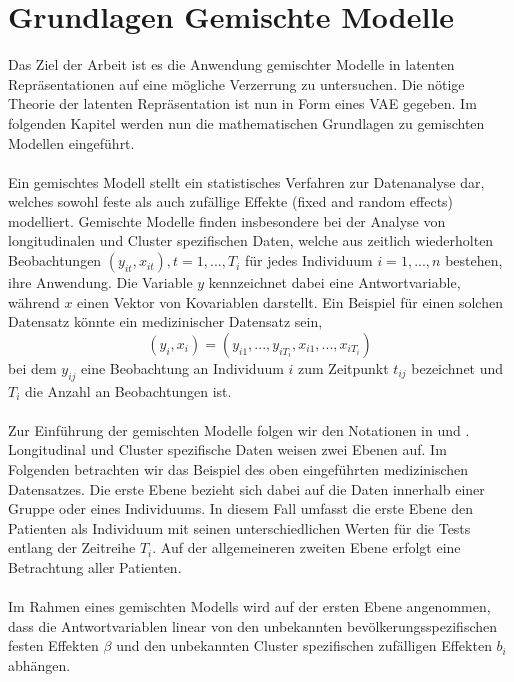 \documentclass[%
thesis=student,%
coverpage=false,%
titlepage=false,%
headmarks=true, %
german,%
font=libertine, %
math=newpxtx, %
BCOR=5mm,%
coverBCOR=11mm%
]{tumbook}
\theoremstyle{break}
\begin{document}

\section{Grundlagen Gemischte Modelle}
Das Ziel der Arbeit ist es die Anwendung gemischter Modelle in latenten Repräsentationen auf eine mögliche Verzerrung zu untersuchen. Die nötige Theorie der latenten Repräsentation ist nun in Form eines VAE gegeben. Im folgenden Kapitel werden nun die mathematischen Grundlagen zu gemischten Modellen eingeführt.\\
\\
Ein gemischtes Modell stellt ein statistisches Verfahren zur Datenanalyse dar, welches sowohl feste als auch zufällige Effekte (fixed and random effects) modelliert. Gemischte Modelle finden insbesondere bei der Analyse von longitudinalen und Cluster spezifischen Daten, welche aus zeitlich wiederholten Beobachtungen $(y_{it}, x_{it}), t = 1,..., T_i$ für jedes Individuum $ i = 1,...,n$ bestehen, ihre Anwendung. Die Variable $y$ kennzeichnet dabei eine Antwortvariable, während $x$ einen Vektor von Kovariablen darstellt. Ein Beispiel für einen solchen Datensatz könnte ein medizinischer Datensatz sein,\\
$$(y_i,x_i)= (y_{i1},...,y_{iT_i},x_{i1},...,x_{iT_i})$$
bei dem $y_{ij}$ eine Beobachtung an Individuum $i$ zum Zeitpunkt $t_{ij}$ bezeichnet und $T_i$ die Anzahl an Beobachtungen ist.\\
\\
Zur Einführung der gemischten Modelle folgen wir den Notationen in \cite{fahrmeir-2001-multivariate} und \cite{fahrmeir-2011-regression}.
Longitudinal und Cluster spezifische Daten weisen zwei Ebenen auf. Im Folgenden betrachten wir das Beispiel des oben eingeführten medizinischen Datensatzes. Die erste Ebene bezieht sich dabei auf die Daten innerhalb einer Gruppe oder eines Individuums. In diesem Fall umfasst die erste Ebene den Patienten als Individuum mit seinen unterschiedlichen Werten für die Tests entlang der Zeitreihe $T_i$. Auf der allgemeineren zweiten Ebene erfolgt eine Betrachtung aller Patienten. \\
\\
Im Rahmen eines gemischten Modells wird auf der ersten Ebene angenommen, dass die Antwortvariablen linear von den unbekannten bevölkerungsspezifischen festen Effekten $\beta$ und den unbekannten Cluster spezifischen zufälligen Effekten $b_i$ abhängen.\\
\end{document}
